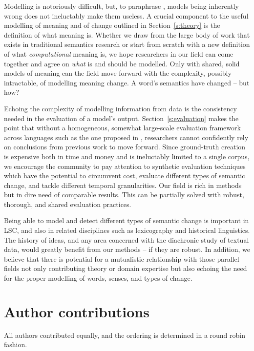 \documentclass[output=paper]{langscibook}
\begin{document}
Modelling is notoriously difficult, but, to paraphrase \citet{box1976science}, models being inherently wrong does not ineluctably make them useless.
A crucial component to the useful modelling of meaning and of change outlined in Section~\ref{s:theory} is the definition of what meaning is. 
Whether we draw from the large body of work that exists in traditional semantics research or start from scratch with a new definition of what \emph{computational} meaning is, we hope researchers in our field can come together and agree on \emph{what} is and should be modelled. Only with shared, solid models of meaning can the field move forward with the complexity, possibly intractable, of modelling meaning change. A word's semantics have changed -- but how?

Echoing the complexity of modelling information from data is the consistency needed in the evaluation of a model's output. Section~\ref{s:evaluation} makes the point that without a homogeneous, somewhat large-scale evaluation framework across languages such as the one proposed in \citet{schlechtweg-etal-2020-semeval}, researchers cannot confidently rely on conclusions from previous work to move forward.
Since ground-truth creation is expensive both in time and money and is ineluctably limited to a single corpus, we encourage the community to pay attention to synthetic evaluation techniques which have the potential to circumvent cost, evaluate different types of semantic change, and tackle different temporal granularities.
Our field is rich in methods but in dire need of comparable results. This can be partially solved with robust, thorough, and shared evaluation practices.

Being able to model and detect different types of semantic change is important in LSC, and also in related disciplines such as lexicography and historical linguistics. 
The history of ideas, and any area concerned with the diachronic study of textual data, would greatly benefit from our methods -- if they are robust. 
In addition, we believe that there is potential for a mutualistic relationship with those parallel fields not only contributing theory or domain expertise but also echoing the need for the proper modelling of words, senses, and types of change.

\section*{Author contributions}
All authors contributed equally, and the ordering is determined in a round robin fashion.
\end{document}
